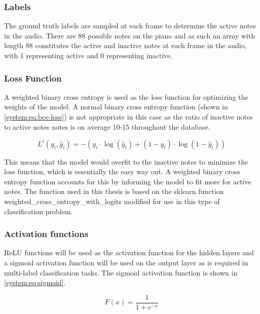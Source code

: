 \subsubsection{Labels}
The ground truth labels are sampled at each frame to determine the active notes
in the audio. There are 88 possible notes on the piano and as such an array with
length 88 constitutes the active and inactive notes at each frame in the audio,
with 1 representing active and 0 representing inactive.

\subsubsection{Loss Function}

A weighted binary cross entropy is used as the loss function for optimizing
the weights of the model. A normal binary cross entropy function (shown in \autoref{system:eq:bce-loss}) is not
appropriate in this case as the ratio of inactive notes to active notes notes is
on average 10-15 throughout the database.

\begin{equation}
    L^{i} (y_{i}, \hat{y}_{i}) = -(y_{i}\cdot \log(\hat{y}_{i}) + (1-y_{i}) \cdot \log(1-\hat{y}_{i}))
    \label{system:eq:bce-loss}
\end{equation}

This means that the model would overfit to the inactive notes to minimize the loss function, which is essentially
the easy way out. A weighted binary cross entropy function accounts for this by
informing the model to fit more for active notes. The function used in this thesis is based on the sklearn function
weighted\_cross\_entropy\_with\_logits modified for use in this type of classification problem.

\subsubsection{Activation functions}

\ac{ReLU} functions will be used as the
activation function for the hidden layers and a sigmoid activation function will
be used on the output layer as is required in multi-label classification tasks. The sigmoid
activation function is shown in \autoref{system:eq:sigmoid}.

\begin{equation}
    F (x) = \frac{1}{1+ e^{-x}}
    \label{system:eq:sigmoid}
\end{equation}

